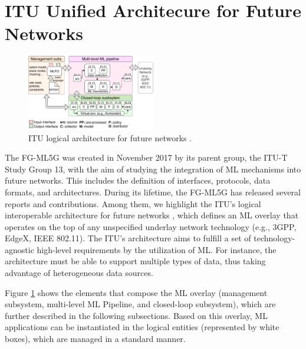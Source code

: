 \documentclass[journal]{IEEEtran}
\begin{document}

\section{ITU Unified Architecure for Future Networks}
\label{section:itu_architecture}

\begin{figure}[!ht]
	\centering
	\includegraphics[width=0.5\textwidth]{itu_ml_architecture}
	\caption{ITU logical architecture for future networks \cite{itu2019architecture}.}
	\label{fig:itu_ml_architecture}
\end{figure}

The FG-ML5G was created in November 2017 by its parent group, the ITU-T Study Group 13, with the aim of studying the integration of ML mechanisms into future networks. This includes the definition of interfaces, protocols, data formats, and architectures. During its lifetime, the FG-ML5G has released several reports and contributions. Among them, we highlight the ITU's logical interoperable architecture for future networks \cite{itu2019architecture}, which defines an ML overlay that operates on the top of any unspecified underlay network technology (e.g., 3GPP, EdgeX, IEEE 802.11). The ITU's architecture aims to fulfill a set of technology-agnostic high-level requirements by the utilization of ML. For instance, the architecture must be able to support multiple types of data, thus taking advantage of heterogeneous data sources. 

Figure \ref{fig:itu_ml_architecture} shows the elements that compose the ML overlay (management subsystem, multi-level ML Pipeline, and closed-loop subsystem), which are further described in the following subsections. Based on this overlay, ML applications can be instantiated in the logical entities (represented by white boxes), which are managed in a standard manner. %
\end{document}

